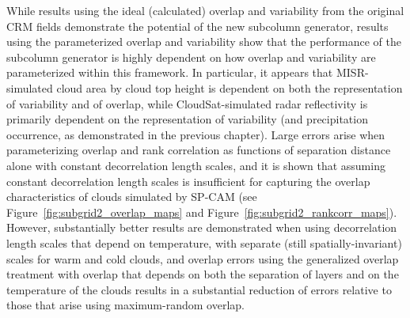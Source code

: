 While results using the ideal (calculated) overlap and variability from
the original CRM fields demonstrate the potential of the new subcolumn
generator, results using the parameterized overlap and variability show
that the performance of the subcolumn generator is highly dependent on
how overlap and variability are parameterized within this framework. In
particular, it appears that MISR-simulated cloud area by cloud top
height is dependent on both the representation of variability and of
overlap, while CloudSat-simulated radar reflectivity is primarily
dependent on the representation of variability (and precipitation
occurrence, as demonstrated in the previous chapter). Large errors arise
when parameterizing overlap and rank correlation as functions of
separation distance alone with constant decorrelation length scales, and
it is shown that assuming constant decorrelation length scales is
insufficient for capturing the overlap characteristics of clouds
simulated by SP-CAM (see Figure~\ref{fig:subgrid2_overlap_maps} and
Figure~\ref{fig:subgrid2_rankcorr_maps}). However, substantially better
results are demonstrated when using decorrelation length scales that
depend on temperature, with separate (still spatially-invariant) scales
for warm and cold clouds, and overlap errors using the generalized
overlap treatment with overlap that depends on both the separation of
layers and on the temperature of the clouds results in a substantial
reduction of errors relative to those that arise using maximum-random
overlap.

